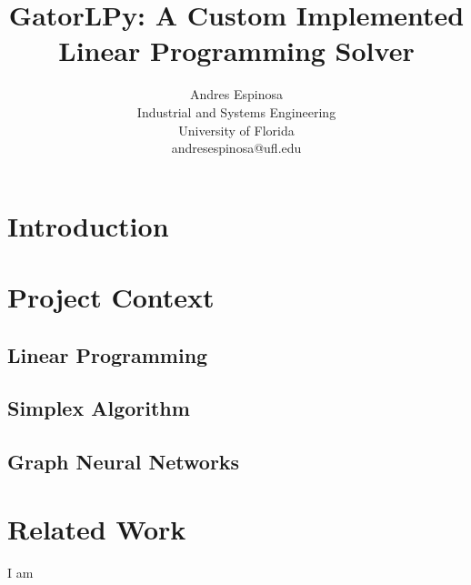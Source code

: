 \documentclass[conference]{IEEEtran}
\begin{document}
\title{GatorLPy: A Custom Implemented Linear Programming Solver}

\author{
    \begin{minipage}{0.50\textwidth}
        \centering
        \textcolor{uf_blue}{Andres Espinosa} \\
        \textcolor{uf_orange}{Industrial and Systems Engineering} \\
        \textcolor{uf_orange}{University of Florida} \\
        \textcolor{uf_orange}{andresespinosa@ufl.edu} \\ 
    \end{minipage}
}


\maketitle


\begin{abstract}

\end{abstract}

\IEEEpeerreviewmaketitle

\section{Introduction}

\section{Project Context}

\subsection{Linear Programming}
\subsection{Simplex Algorithm}
\subsection{Graph Neural Networks}

\section{Related Work}
I am \cite{gnndrl:Devailly_2022}
\end{document}
